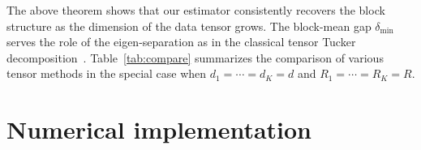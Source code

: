\documentclass[11pt]{article}
\theoremstyle{plain}
\newtheorem{theorem}{Theorem}
\theoremstyle{definition}
\begin{document}
The above theorem shows that our estimator consistently recovers the block structure as the dimension of the data tensor grows. The block-mean gap $\delta_{\min}$ serves the role of the eigen-separation as in the classical tensor Tucker decomposition~\cite{zhang2018tensor}. Table~\ref{tab:compare} summarizes the comparison of various tensor methods in the special case when $d_1=\cdots=d_K=d$ and $R_1=\cdots=R_K=R$. 
\begin{table}[htbp]
\caption{Comparison of various tensor decomposition methods.}\label{tab:compare}

\end{table}






\section{Numerical implementation}
\end{document}
